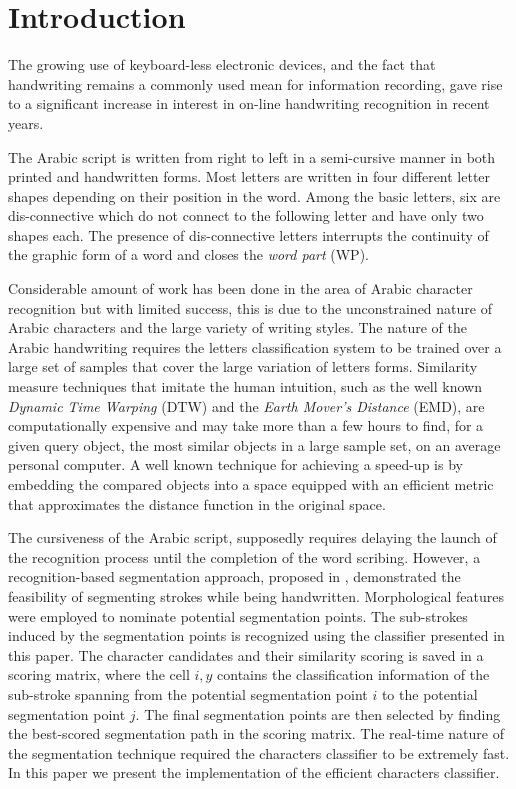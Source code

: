 \documentclass[10pt, conference, compsocconf]{IEEEtran}
\begin{document}
\section{Introduction}
The growing use of keyboard-less electronic devices, and the fact that handwriting remains a commonly used mean for information recording, gave rise to a significant increase in interest in on-line handwriting recognition in recent years.

The Arabic script is written from right to left in a semi-cursive manner in both printed and handwritten forms. 
Most letters are written in four different letter shapes depending on their position in the word.
Among the basic letters, six are dis-connective which do not connect to the following letter and have only two shapes each. 
The presence of dis-connective letters interrupts the continuity of the graphic form of a word and closes the \emph{word part} (WP).

Considerable amount of work has been done in the area of Arabic character recognition but with limited success, this is due to the unconstrained nature of Arabic characters and the large variety of writing styles.
The nature of the Arabic handwriting requires the letters classification system to be trained over a large set of samples that cover the large variation of letters forms.
Similarity measure techniques that imitate the human intuition, such as the well known \emph{Dynamic Time Warping} (DTW) and the \emph{Earth Mover's Distance} (EMD), are computationally expensive and may take more than a few hours to find, for a given query object, the most similar objects in a large sample set, on an average personal computer.
A well known technique for achieving a speed-up is by embedding the compared objects into a space equipped with an efficient metric that approximates the distance function in the original space.

The cursiveness of the Arabic script, supposedly requires delaying the launch of the recognition process until the completion of the word scribing.
However, a recognition-based segmentation approach, proposed in \cite{kour2014real}, demonstrated the feasibility of segmenting strokes while being handwritten.
Morphological features were employed to nominate potential segmentation points. 
The sub-strokes induced by the segmentation points is recognized using the classifier presented in this paper.
The character candidates and their similarity scoring is saved in a scoring matrix, where the cell ${i,y}$ contains the classification information of the sub-stroke spanning from the potential segmentation point $i$ to the potential segmentation point $j$.
The final segmentation points are then selected by finding the best-scored segmentation path in the scoring matrix. 
The real-time nature of the segmentation technique required the characters classifier to be extremely fast.
In this paper we present the implementation of the efficient characters classifier.
\end{document}
